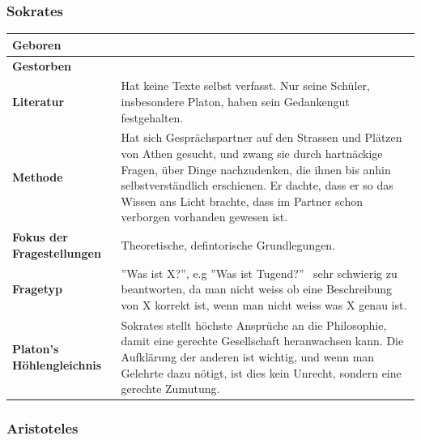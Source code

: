			
		\subsubsection{Sokrates}
			\begin{longtable}{>{\bfseries}p{}p{}}
				\hline
				Geboren
					& \\
				\hline
				Gestorben
					& \\
				\hline
				Literatur
					& Hat keine Texte selbst verfasst.\newline
						Nur seine Schüler, insbesondere Platon, haben sein Gedankengut festgehalten.\\
				\hline
				Methode
					& Hat sich Gesprächspartner auf den Strassen und Plätzen von Athen gesucht, und zwang sie durch hartnäckige Fragen, über Dinge nachzudenken, die ihnen bis anhin selbstverständlich erschienen.\newline
						Er dachte, dass er so das Wissen ans Licht brachte, dass im Partner schon verborgen vorhanden gewesen ist.\\
				\hline
				Fokus der Fragestellungen
					& Theoretische, defintorische Grundlegungen.\\
				\hline
				Fragetyp
					& ''Was ist X?'', e.g ''Was ist Tugend?''\newline
						\textrightarrow\ sehr schwierig zu beantworten, da man nicht weiss ob eine Beschreibung von X korrekt ist, wenn man nicht weiss was X genau ist.\\
				\hline
				Platon's Höhlengleichnis
					& Sokrates stellt höchste Ansprüche an die Philosophie, damit eine gerechte Gesellschaft heranwachsen kann. Die Aufklärung der anderen ist wichtig, und wenn man Gelehrte dazu nötigt, ist dies kein Unrecht, sondern eine gerechte Zumutung.\\
				\hline
			\end{longtable}	
			
			
		\subsubsection{Aristoteles}
			
